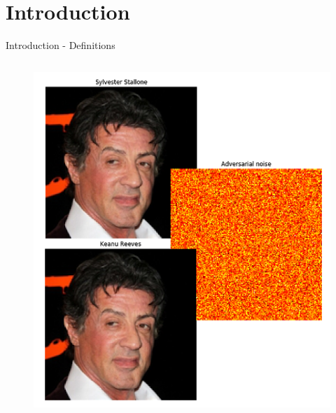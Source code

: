 \documentclass{beamer}
\begin{document}
\section{Introduction }
\begin{frame}{Introduction - Definitions}
    \begin{columns}
    \begin{column}{.29\textwidth}
    \vspace*{-4mm}
    \begin{figure}
        \includegraphics[width=1.\textwidth]{images/Definitions-examples/sly_ex.png}
    \end{figure}
    \vspace{-6mm}
    \vspace{-1mm}
    \begin{figure}

\end{figure}
\end{column}
\end{columns}
\end{frame}
\end{document}
